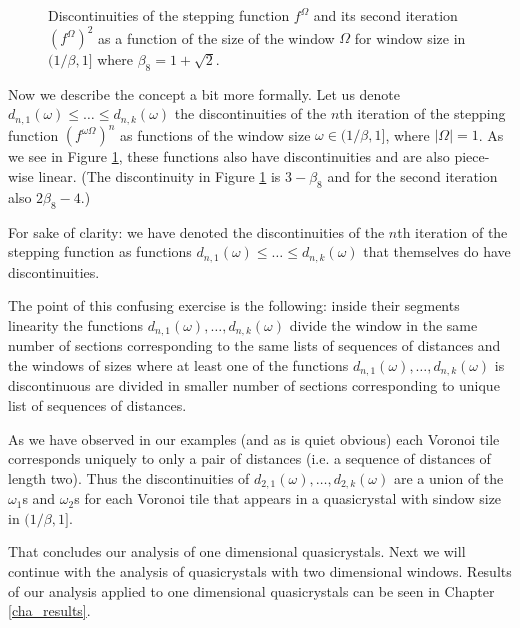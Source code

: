 \documentclass[text.tex]{subfiles}
\begin{document}
\begin{figure}[h!]
\caption{Discontinuities of the stepping function $f^\Omega$ and its second iteration $(f^\Omega)^2$ as a function of the size of the window $\Omega$ for window size in $(1/\beta,1]$ where $\beta_8 = 1+\sqrt{2}$. }
\label{fig_steppingFunctionDiscontinuities}
\end{figure}

Now we describe the concept a bit more formally. Let us denote $d_{n,1}(\omega)\leq\dots\leq d_{n,k}(\omega)$ the discontinuities of the $n$th iteration of the stepping function $(f^{\omega\Omega})^n$ as functions of the window size $\omega\in(1/\beta,1]$, where $|\Omega|=1$. As we see in Figure \ref{fig_steppingFunctionDiscontinuities}, these functions also have discontinuities and are also piece-wise linear. (The discontinuity in Figure \ref{fig_steppingFunctionDiscontinuities} is $3-\beta_8$ and for the second iteration also $2\beta_8-4$.) 

For sake of clarity: we have denoted the discontinuities of the $n$th iteration of the stepping function as functions $d_{n,1}(\omega)\leq\dots\leq d_{n,k}(\omega)$ that themselves do have discontinuities. 

The point of this confusing exercise is the following: inside their segments linearity the functions $d_{n,1}(\omega),\dots, d_{n,k}(\omega)$ divide the window in the same number of sections corresponding to the same lists of sequences of distances and the windows of sizes where at least one of the functions $d_{n,1}(\omega),\dots, d_{n,k}(\omega)$ is discontinuous are divided in smaller number of sections corresponding to unique list of sequences of distances. 

As we have observed in our examples (and as is quiet obvious) each Voronoi tile corresponds uniquely to only a pair of distances (i.e. a sequence of distances of length two). Thus the discontinuities of $d_{2,1}(\omega),\dots, d_{2,k}(\omega)$ are a union of the $\omega_1$s and $\omega_2$s for each Voronoi tile that appears in a quasicrystal with sindow size in $(1/\beta,1]$. 

That concludes our analysis of one dimensional quasicrystals. Next we will continue with the analysis of quasicrystals with two dimensional windows. Results of our analysis applied to one dimensional quasicrystals can be seen in Chapter \ref{cha_results}. 
\end{document}
